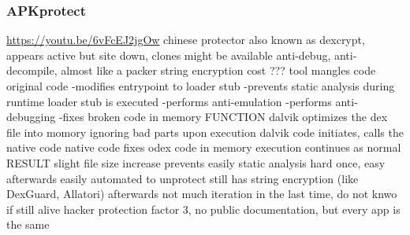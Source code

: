\subsubsection{APKprotect}
\url{https://youtu.be/6vFcEJ2jgOw}\newline
chinese protector\newline
also known as dexcrypt, appears active but site down, clones might be available\newline
anti-debug, anti-decompile, almost like a packer\newline
string encryption\newline
cost ???\newline
tool mangles code original code\newline
-modifies entrypoint to loader stub\newline
-prevents static analysis\newline
during runtime loader stub is executed\newline
-performs anti-emulation\newline
-performs anti-debugging\newline
-fixes broken code in memory\newline
FUNCTION\newline
dalvik optimizes the dex file into momory ignoring bad parts\newline
upon execution dalvik code initiates, calls the native code\newline
native code fixes odex code in memory\newline
execution continues as normal\newline
RESULT\newline
slight file size increase\newline
prevents easily static analysis\newline
hard once, easy afterwards\newline
easily automated to unprotect\newline
still has string encryption (like DexGuard, Allatori) afterwards\newline
not much iteration in the last time, do not knwo if still alive\newline
hacker protection factor 3, no public documentation, but every app is the same\newline


